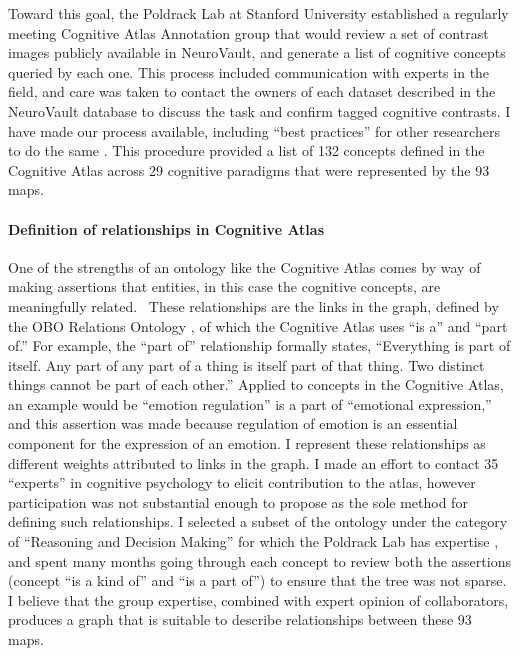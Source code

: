 \documentclass{report}
\begin{document}
Toward this goal, the Poldrack Lab at Stanford University established a
regularly meeting Cognitive Atlas Annotation group that would review a
set of contrast images publicly available in NeuroVault, and generate a list of cognitive concepts queried by each
one. This process included communication with experts in the field, and
care was taken to contact the owners of each dataset described in the
NeuroVault database to discuss the task and confirm tagged cognitive
contrasts. I have made our process available, including ``best
practices'' for other researchers to do the same \cite{Vsoch_undated-gw}.
This procedure provided a list of 132 concepts defined in the Cognitive
Atlas across 29 cognitive paradigms that were represented by the 93
maps.

\paragraph{Definition of relationships in Cognitive Atlas}

One of the strengths of an ontology like the Cognitive Atlas comes by
way of making assertions that entities, in this case the cognitive
concepts, are meaningfully related. ~These relationships are the links
in the graph, defined by the OBO Relations Ontology \cite{Mungall2015-yh},
of which the Cognitive Atlas uses ``is a'' and ``part of.'' For example,
the ``part of'' relationship formally states, ``Everything is part of
itself. Any part of any part of a thing is itself part of that thing.
Two distinct things cannot be part of each other.'' Applied to concepts
in the Cognitive Atlas, an example would be ``emotion regulation'' is a
part of ``emotional expression,'' and this assertion was made because
regulation of emotion is an essential component for the expression of an
emotion. I represent these relationships as different weights attributed
to links in the graph. I made an effort to contact 35 ``experts'' in
cognitive psychology to elicit contribution to the atlas, however
participation was not substantial enough to propose as the sole method
for defining such relationships. I selected a subset of the ontology
under the category of ``Reasoning and Decision Making'' for which the
Poldrack Lab has expertise
\cite{Bissett2012-aq,Bissett2014-td,Bissett2011-of,Bissett2012-yu,Bissett2013-ep,Yamaguchi2012-yn,Poldrack2009-ux,Poldrack2011-jp,Lenartowicz2010-bh,Tom2007-kx,Poldrack1999-cr},
and spent many months going through each concept to review both the
assertions (concept ``is a kind of'' and ``is a part of'') to ensure
that the tree was not sparse. I believe that the group expertise,
combined with expert opinion of collaborators, produces a graph that is
suitable to describe relationships between these 93 maps.
\end{document}
